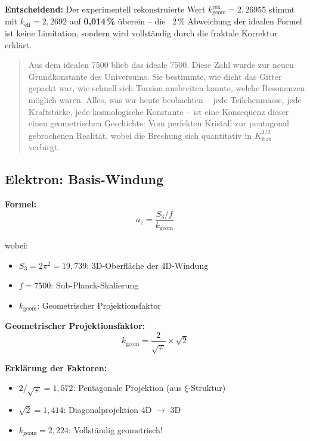 	\textbf{Entscheidend:} Der experimentell rekonstruierte Wert \(k_\text{geom}^\text{rek} = 2{,}26955\) stimmt mit $k_\text{eff} = 2{,}2692$ auf \textbf{0{,}014\,\%} überein -- die ~2\,\% Abweichung der idealen Formel ist keine Limitation, sondern wird vollständig durch die fraktale Korrektur erklärt.
	\begin{quotation}
		Aus dem idealen 7500 blieb das ideale 7500. Diese Zahl wurde zur neuen Grundkonstante des Universums. Sie bestimmte, wie dicht das Gitter gepackt war, wie schnell sich Torsion ausbreiten konnte, welche Resonanzen möglich waren.
		Alles, was wir heute beobachten -- jede Teilchenmasse, jede Kraftstärke, jede kosmologische Konstante -- ist eine Konsequenz dieser einen geometrischen Geschichte: Vom perfekten Kristall zur pentagonal gebrochenen Realität, wobei die Brechung sich quantitativ in $K_\text{frak}^{3/2}$ verbirgt.
	\end{quotation}
	
	\subsection{Elektron: Basis-Windung}
	
	\textbf{Formel:}
	\begin{equation}
		a_e = \frac{S_3/f}{k_{\text{geom}}}
		\label{eq:ae}
	\end{equation}
	
	wobei:
	\begin{itemize}
		\item $S_3 = 2\pi^2 = 19{,}739$: 3D-Oberfläche der 4D-Windung
		\item $f = 7500$: Sub-Planck-Skalierung
		\item $k_{\text{geom}}$: Geometrischer Projektionsfaktor
	\end{itemize}
	
	\textbf{Geometrischer Projektionsfaktor:}
	\begin{equation}
		k_{\text{geom}} = \frac{2}{\sqrt{\varphi}} \times \sqrt{2}
		\label{eq:kgeom}
	\end{equation}
	
	\textbf{Erklärung der Faktoren:}
	\begin{itemize}
		\item $2/\sqrt{\varphi} = 1{,}572$: Pentagonale Projektion (aus $\xi$-Struktur)
		\item $\sqrt{2} = 1{,}414$: Diagonalprojektion 4D $\to$ 3D
		\item $k_{\text{geom}} = 2{,}224$: Vollständig geometrisch!
	\end{itemize}
	
